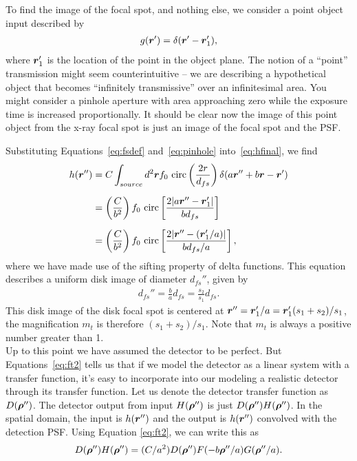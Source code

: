 \documentclass[mphy386-notes.tex]{subfiles}
\begin{document}

To find the image of the focal spot, and nothing else, we consider a point
object input described by
\begin{align}
  g(\boldsymbol{r}') = \delta(\boldsymbol{r}'-\boldsymbol{r}_1'),
  \label{eq:pinhole}
\end{align}
where $\boldsymbol{r}_1'$ is the location of the point in the object plane. The notion
of a ``point'' transmission might seem counterintuitive -- we are describing a
hypothetical object that becomes ``infinitely transmissive'' over an
infinitesimal area. You might consider a pinhole aperture with area
approaching zero while the exposure time is increased proportionally.  It should
be clear now the image of this point object from the x-ray focal spot is just
an image of the focal spot and the PSF.

Substituting Equations~\ref{eq:fsdef} and~\ref{eq:pinhole} into~\ref{eq:hfinal}, we find
\begin{align}
  h(\boldsymbol{r}'') &= C \int_{source} d^2\boldsymbol{r} f_0 \text{ circ} \left(\frac{2r}{d_{fs}}\right)\delta(a\boldsymbol{r}'' + b\boldsymbol{r}-\boldsymbol{r}')\nonumber\\[6pt]
              &= \left(\frac{C}{b^2}\right) f_0 \text{ circ}\left[\frac{2|a\boldsymbol{r}'' - \boldsymbol{r}_1'|}{bd_{fs}}\right]\nonumber\\[6pt]
              &= \left(\frac{C}{b^2}\right) f_0 \text{ circ}\left[\frac{2|\boldsymbol{r}''-(\boldsymbol{r}_1'/a)|}{b d_{fs} / a}\right],
\end{align}
where we have made use of the sifting property of delta functions. This equation
describes a uniform disk image of diameter $d_{fs}''$, given by
\begin{align}
  d_{fs}'' = \frac{b}{a}d_{fs} = \frac{s_2}{s_1}d_{fs}.
\end{align}
This disk image of the disk focal spot is centered at $\boldsymbol{r}'' = \boldsymbol{r}_1'/a = \boldsymbol{r}_1'(s_1 + s_2)/s_1$, the
magnification $m_t$ is therefore $(s_1 + s_2)/s_1$. Note that $m_t$ is always a positive number greater than 1. \\

Up to this point we have assumed the detector to be perfect.  But Equations~\ref{eq:ft2}
tells us that if we model the detector as a linear system with a transfer function, it's
easy to incorporate into our modeling a realistic detector through its transfer function.
Let us denote the detector transfer function as $D(\boldsymbol{\rho}'')$.  The detector output from
input $H(\boldsymbol{\rho}'')$ is just $D(\boldsymbol{\rho}'')H(\boldsymbol{\rho}'')$.  In the spatial domain,
the input is $h(\boldsymbol{r}'')$ and the output is $h(\boldsymbol{r}'')$ convolved with the detection
PSF.  Using Equation \ref{eq:ft2}, we can write this as
\begin{align}
  D(\boldsymbol{\rho}'')H(\boldsymbol{\rho}'') = (C/a^2)D(\boldsymbol{\rho}'')F(-b\boldsymbol{\rho}''/a)G(\boldsymbol{\rho}''/a).
\end{align}
\end{document}
